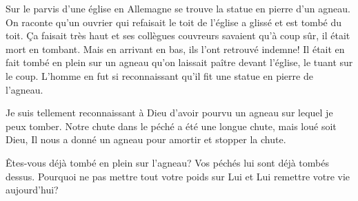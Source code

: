 Sur le parvis d'une église en Allemagne se trouve la statue en pierre d'un agneau. On raconte qu'un ouvrier qui refaisait le toit de l'église a glissé et est tombé du toit. Ça faisait très haut et ses collègues couvreurs savaient qu'à coup sûr, il était mort en tombant. Mais en arrivant en bas, ils l'ont retrouvé indemne! Il était en fait tombé en plein sur un agneau qu'on laissait paître devant l'église, le tuant sur le coup. L'homme en fut si reconnaissant qu'il fit une statue en pierre de l'agneau.

Je suis tellement reconnaissant à Dieu d'avoir pourvu un agneau sur lequel je peux tomber. Notre chute dans le péché a été une longue chute, mais loué soit Dieu, Il nous a donné un agneau pour amortir et stopper la chute.


Êtes-vous déjà tombé en plein sur l'agneau? Vos péchés lui sont déjà tombés dessus. Pourquoi ne pas mettre tout votre poids sur Lui et Lui remettre votre vie aujourd'hui?

\ornrule


